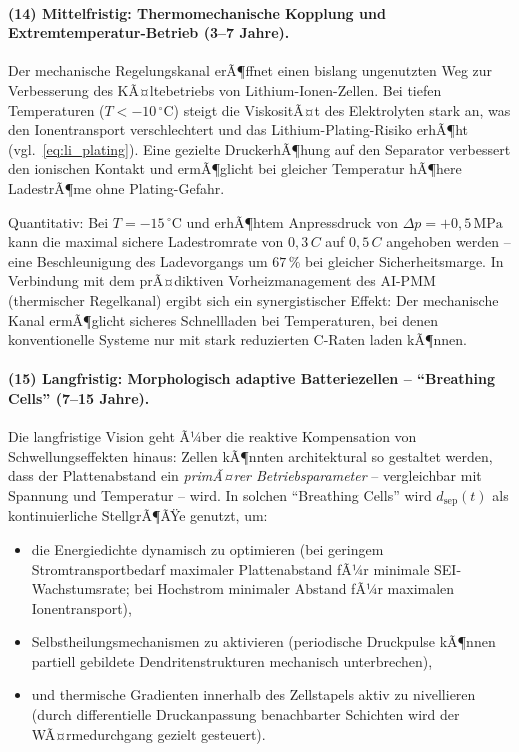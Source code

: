 ﻿\documentclass[12pt,a4paper]{article}
\begin{document}
\paragraph{(14) Mittelfristig: Thermomechanische Kopplung und
	Extremtemperatur-Betrieb (3--7 Jahre).}
Der mechanische Regelungskanal erÃ¶ffnet einen bislang ungenutzten Weg
zur Verbesserung des KÃ¤ltebetriebs von Lithium-Ionen-Zellen. Bei tiefen
Temperaturen ($T < -10\,^\circ\mathrm{C}$) steigt die ViskositÃ¤t des
Elektrolyten stark an, was den Ionentransport verschlechtert und das
Lithium-Plating-Risiko erhÃ¶ht (vgl.\ \eqref{eq:li_plating}). Eine
gezielte DruckerhÃ¶hung auf den Separator verbessert den ionischen Kontakt
und ermÃ¶glicht bei gleicher Temperatur hÃ¶here LadestrÃ¶me ohne Plating-Gefahr.

Quantitativ: Bei $T = -15\,^\circ\mathrm{C}$ und erhÃ¶htem Anpressdruck
von $\Delta p = +0{,}5\,\mathrm{MPa}$ kann die maximal sichere Ladestromrate
von $0{,}3\,C$ auf $0{,}5\,C$ angehoben werden -- eine Beschleunigung des
Ladevorgangs um $67\,\%$ bei gleicher Sicherheitsmarge. In Verbindung mit
dem prÃ¤diktiven Vorheizmanagement des AI-PMM (thermischer Regelkanal) ergibt
sich ein synergistischer Effekt: Der mechanische Kanal ermÃ¶glicht sicheres
Schnellladen bei Temperaturen, bei denen konventionelle Systeme nur mit stark
reduzierten C-Raten laden kÃ¶nnen.

\paragraph{(15) Langfristig: Morphologisch adaptive Batteriezellen --
	``Breathing Cells'' (7--15 Jahre).}
Die langfristige Vision geht Ã¼ber die reaktive Kompensation von
Schwellungseffekten hinaus: Zellen kÃ¶nnten architektural so gestaltet werden,
dass der Plattenabstand ein \textit{primÃ¤rer Betriebsparameter} -- vergleichbar
mit Spannung und Temperatur -- wird. In solchen ``Breathing Cells'' wird
$d_\mathrm{sep}(t)$ als kontinuierliche StellgrÃ¶ÃŸe genutzt, um:

\begin{itemize}[leftmargin=*]
	\item die Energiedichte dynamisch zu optimieren (bei geringem Stromtransportbedarf
	maximaler Plattenabstand fÃ¼r minimale SEI-Wachstumsrate; bei Hochstrom
	minimaler Abstand fÃ¼r maximalen Ionentransport),
	\item Selbstheilungsmechanismen zu aktivieren (periodische Druckpulse
	kÃ¶nnen partiell gebildete Dendritenstrukturen mechanisch unterbrechen),
	\item und thermische Gradienten innerhalb des Zellstapels aktiv zu
	nivellieren (durch differentielle Druckanpassung benachbarter Schichten
	wird der WÃ¤rmedurchgang gezielt gesteuert).
\end{itemize}
\end{document}
